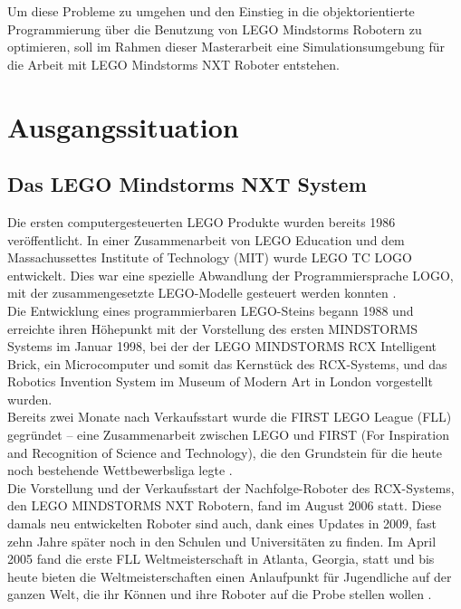 \documentclass[paper=a4, pagesize, DIV=calc, BCOR=12.5mm, twoside=on, onecolumn=on, open = any, titlepage =on, parskip =half-, headsepline = on, footsepline = on, chapterprefix = on, appendixprefix = off, fontsize = 12pt, numbers = noenddot, abstract = on]{scrbook}
\numberwithin{equation}{chapter}
\theoremstyle{definition}
\theoremstyle{plain}
\theoremstyle{plain}
\theoremstyle{remark}
\theoremstyle{plain}
\theoremstyle{plain}
\begin{document}
Um diese Probleme zu umgehen und den Einstieg in die objektorientierte Programmierung über die Benutzung von LEGO Mindstorms Robotern zu optimieren, soll im Rahmen dieser Masterarbeit eine Simulationsumgebung für die Arbeit mit LEGO Mindstorms NXT Roboter entstehen.
\newpage
\par\singlespacing
\chapter{Ausgangssituation}

\par\singlespacing
\section{Das LEGO Mindstorms NXT System}
\onehalfspacing
Die ersten computergesteuerten LEGO Produkte wurden bereits 1986 veröffentlicht. In einer Zusammenarbeit von LEGO Education und dem Massachussettes Institute of Technology (MIT) wurde LEGO TC LOGO entwickelt. Dies war eine spezielle Abwandlung der Programmiersprache LOGO, mit der zusammengesetzte LEGO-Modelle gesteuert werden konnten \cite{rolling:14}.\\
Die Entwicklung eines programmierbaren LEGO-Steins begann 1988 und erreichte ihren Höhepunkt mit der Vorstellung des ersten MINDSTORMS Systems im Januar 1998, bei der der LEGO MINDSTORMS RCX Intelligent Brick, ein Microcomputer und somit das Kernstück des RCX-Systems, und das Robotics Invention System im Museum of Modern Art in London vorgestellt wurden.\\
Bereits zwei Monate nach Verkaufsstart wurde die FIRST LEGO League (FLL) gegründet -- eine Zusammenarbeit zwischen LEGO und FIRST (For Inspiration and Recognition of Science and Technology), die den Grundstein für die heute noch bestehende Wettbewerbsliga legte \cite{rolling:14}.\\
Die Vorstellung und der Verkaufsstart der Nachfolge-Roboter des RCX-Systems, den LEGO MINDSTORMS NXT Robotern, fand im August 2006 statt. Diese damals neu entwickelten Roboter sind auch, dank eines Updates in 2009, fast zehn Jahre später noch in den Schulen und Universitäten zu finden. Im April 2005 fand die erste FLL Weltmeisterschaft in Atlanta, Georgia, statt und bis heute bieten die Weltmeisterschaften einen Anlaufpunkt für Jugendliche auf der ganzen Welt, die ihr Können und ihre Roboter auf die Probe stellen wollen \cite{lego}.\\

\end{document}
